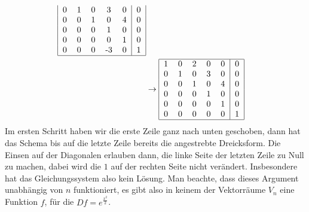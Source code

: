 \begin{loesung}
\begin{teilaufgaben}
\begin{align*}
\begin{tabular}{|ccccc|c|}
0&1&0&3&0&0\\
0&0&1&0&4&0\\
0&0&0&1&0&0\\
0&0&0&0&1&0\\
0&0&0&-3&0&1\\
\hline
\end{tabular}
\\
&\rightarrow
\begin{tabular}{|ccccc|c|}
\hline
1&0&2&0&0&0\\
0&1&0&3&0&0\\
0&0&1&0&4&0\\
0&0&0&1&0&0\\
0&0&0&0&1&0\\
0&0&0&0&0&1\\
\hline
\end{tabular}
\end{align*}
Im ersten Schritt haben wir die erste Zeile ganz nach unten geschoben,
dann hat das Schema bis auf die letzte Zeile bereits die angestrebte
Dreicksform. Die Einsen auf der Diagonalen erlauben dann, die linke
Seite der letzten Zeile zu Null zu machen, dabei wird die $1$ auf der
rechten Seite nicht verändert. Insbesondere hat das Gleichungssystem
also kein Lösung. Man beachte, dass dieses Argument unabhängig von
$n$ funktioniert, es gibt also in keinem der Vektorräume $V_n$
eine Funktion $f$, für die $Df=e^{\frac{x^2}2}$.
\qedhere
\end{teilaufgaben}
\end{loesung}

